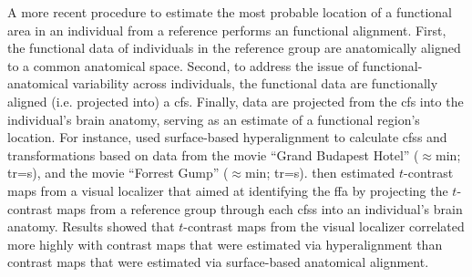 
A more recent procedure \citep[e.g., ][]{jiahui2020predicting,
guntupalli2016model, haxby2011common} to estimate the most probable location of
a functional area in an individual from a reference performs an functional
alignment.
First, the functional data of individuals in the reference group are
anatomically aligned to a common anatomical space.
%
Second, to address the issue of functional-anatomical variability across
individuals, the functional data are functionally aligned (i.e. projected into)
a \ac{cfs}.
%
Finally, data are projected from the \ac{cfs} into the individual's
brain anatomy, serving as an estimate of a functional region's location.
For instance, \citet{jiahui2020predicting} used surface-based hyperalignment to
calculate \acp{cfs} and transformations based on data from
%
the movie ``Grand Budapest Hotel'' ($\approx$\unit[50]{min}; \ac{tr}=\unit[1]{s}),
and
%
the movie ``Forrest Gump'' ($\approx$\unit[120]{min}; \ac{tr}=\unit[2]{s}).
%
\citet{jiahui2020predicting} then estimated $t$-contrast maps from a visual
localizer that aimed at identifying the \ac{ffa} by projecting the $t$-contrast
maps from a reference group through each \acp{cfs} into an individual's brain
anatomy.
%
Results showed that $t$-contrast maps from the visual localizer correlated more
highly with contrast maps that were estimated via hyperalignment than contrast
maps that were estimated via surface-based anatomical alignment.



